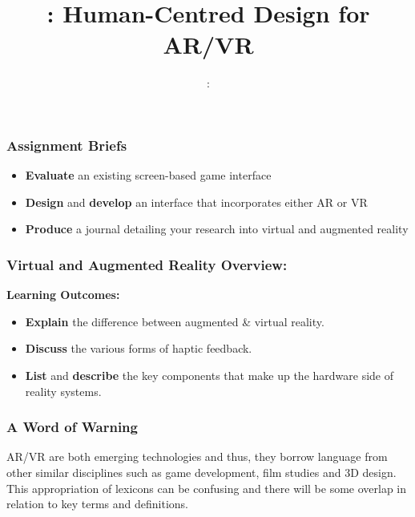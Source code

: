 \usepackage{../../beamerthemeFalmouthGamesAcademy}
\usepackage{multimedia}
\usepackage{soul}
\usepackage{tikz}
\usepackage{verbatim}
\graphicspath{ {../../} }


\usepackage[normalem]{ulem}
\usepackage{wasysym}

\usepackage{pdfpages}

\usetikzlibrary{arrows,automata}




\title{\sessionnumber: \normalsize{Human-Centred Design for AR/VR}}
\subtitle{\modulecode: \moduletitle}

\frame{\titlepage} 

\begin{frame}
	\frametitle{Assignment Briefs}
	\begin{itemize}
		\item \textbf{Evaluate} an existing screen-based game interface
		\item \textbf{Design} and \textbf{develop} an interface that incorporates either AR or VR
		\item \textbf{Produce} a journal detailing your research into virtual and augmented reality
	\end{itemize}
\end{frame}

\begin{frame}
	\frametitle{Virtual and Augmented Reality Overview:}
	
	\textbf{Learning Outcomes:}
	
	\begin{itemize}
		\item \textbf{Explain} the difference between augmented \& virtual reality. 
		\item \textbf{Discuss} the various forms of haptic feedback.
		\item \textbf{List} and \textbf{describe} the key components that make up the hardware side of reality systems.	
	\end{itemize}
\end{frame}

\begin{frame}
	\frametitle{A Word of Warning}
	AR/VR are both emerging technologies and thus, they borrow language from other similar disciplines such as game development, film studies and 3D design. This appropriation of lexicons can be confusing and there will be some overlap in relation to key terms and definitions.
\end{frame}

